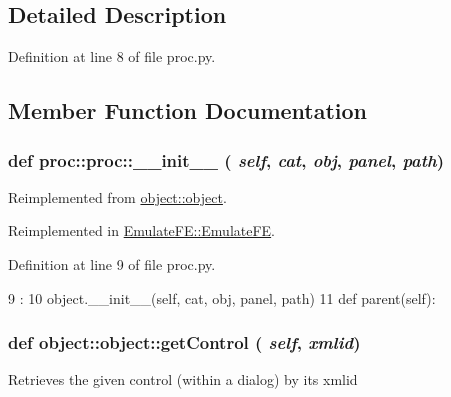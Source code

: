 \subsection{Detailed Description}


Definition at line 8 of file proc.py.

\subsection{Member Function Documentation}
\hypertarget{classproc_1_1proc_a21e9bcad44f0098f74639f245d2d0e4b}{
\subsubsection[{\_\-\_\-init\_\-\_\-}]{\setlength{\rightskip}{0pt plus 5cm}def proc::proc::\_\-\_\-init\_\-\_\- ( {\em self}, \/   {\em cat}, \/   {\em obj}, \/   {\em panel}, \/   {\em path})}}
\label{classproc_1_1proc_a21e9bcad44f0098f74639f245d2d0e4b}


Reimplemented from \hyperlink{classobject_1_1object_a1220f7c88ee9a71fcfd9acb49a2f44d8}{object::object}.

Reimplemented in \hyperlink{classEmulateFE_1_1EmulateFE_a3749dd5f45e93a8550800372a3ee40b6}{EmulateFE::EmulateFE}.

Definition at line 9 of file proc.py.


\begin{DoxyCode}
9                                              :
10         object.__init__(self, cat, obj, panel, path)
11         
    def parent(self):
\end{DoxyCode}
\hypertarget{classobject_1_1object_ac765747a2b581d48eeb94e600c31fc3f}{
\subsubsection[{getControl}]{\setlength{\rightskip}{0pt plus 5cm}def object::object::getControl ( {\em self}, \/   {\em xmlid})}}
\label{classobject_1_1object_ac765747a2b581d48eeb94e600c31fc3f}
\begin{DoxyVerb}Retrieves the given control (within a dialog) by its xmlid\end{DoxyVerb}
 

